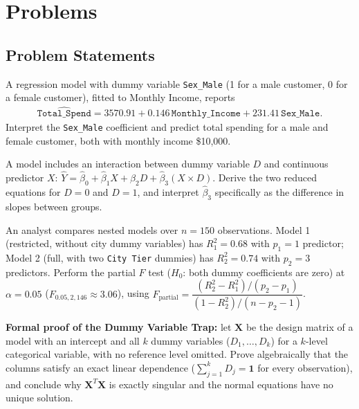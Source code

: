 \section*{Problems}

\subsection*{Problem Statements}

\begin{problema}
\label{prob:9556f7f}
A regression model with dummy variable \texttt{Sex\_Male} (1 for a male customer, 0 for a female customer), fitted to Monthly Income, reports
\begin{align}
\hat{\texttt{Total\_Spend}}=3570.91+0.146\,\texttt{Monthly\_Income}+231.41\,\texttt{Sex\_Male}.
\end{align}
Interpret the \texttt{Sex\_Male} coefficient and predict total spending for a male and female customer, both with monthly income \$10,000.
\end{problema}

\begin{problema}
\label{prob:f520b9b}
A model includes an interaction between dummy variable $D$ and continuous predictor $X$: $\hat Y=\hat\beta_0+\hat\beta_1X+\hat\beta_2D+\hat\beta_3(X\times D)$. Derive the two reduced equations for $D=0$ and $D=1$, and interpret $\hat\beta_3$ specifically as the difference in slopes between groups.
\end{problema}

\begin{problema}
\label{prob:5652f5a}
An analyst compares nested models over $n=150$ observations. Model 1 (restricted, without city dummy variables) has $R_1^2=0.68$ with $p_1=1$ predictor; Model 2 (full, with two \texttt{City Tier} dummies) has $R_2^2=0.74$ with $p_2=3$ predictors. Perform the partial $F$ test ($H_0$: both dummy coefficients are zero) at $\alpha=0.05$ ($F_{0.05,2,146}\approx3.06$), using $F_{\text{partial}}=\dfrac{(R_2^2-R_1^2)/(p_2-p_1)}{(1-R_2^2)/(n-p_2-1)}$.
\end{problema}

\begin{problema}
\label{prob:43c3e82}
\textbf{Formal proof of the Dummy Variable Trap:} let $\mathbf X$ be the design matrix of a model with an intercept and all $k$ dummy variables ($D_1,\ldots,D_k$) for a $k$-level categorical variable, with no reference level omitted. Prove algebraically that the columns satisfy an exact linear dependence ($\sum_{j=1}^kD_j=\mathbf1$ for every observation), and conclude why $\mathbf X^T\mathbf X$ is exactly singular and the normal equations have no unique solution.
\end{problema}

